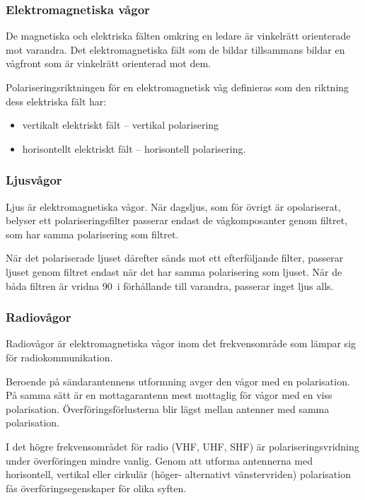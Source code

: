 \subsubsection{Elektromagnetiska vågor}

De magnetiska och elektriska fälten omkring en ledare är vinkelrätt orienterade
mot varandra.
Det elektromagnetiska fält som de bildar tillsammans bildar en vågfront som
är vinkelrätt orienterad mot dem.

Polariseringsriktningen för en elektromagnetisk våg definieras som den riktning
dess elektriska fält har:
\begin{itemize}
  \item vertikalt elektriskt fält -- vertikal polarisering
  \item horisontellt elektriskt fält -- horisontell polarisering.
\end{itemize}

\subsubsection{Ljusvågor}

Ljus är elektromagnetiska vågor.
När dagsljus, som för övrigt är opolariserat, belyser ett polariseringsfilter passerar endast de vågkomposanter genom filtret, som har samma polarisering
som filtret.

När det polariserade ljuset därefter sänds mot ett efterföljande filter, passerar ljuset genom filtret endast när det har samma polarisering som ljuset.
När de båda filtren är vridna 90\degree~i förhållande till varandra, passerar
inget ljus alls.

\subsubsection{Radiovågor}

Radiovågor är elektromagnetiska vågor inom det frekvensområde som lämpar sig
för radiokommunikation.

Beroende på sändarantennens utformning avger den vågor med en polarisation.
På samma sätt är en mottagarantenn mest mottaglig för vågor med en viss
polarisation.
Överföringsförlusterna blir lägst mellan antenner med samma polarisation.

I det högre frekvensområdet för radio (VHF, UHF, SHF) är polariseringsvridning
under överföringen mindre vanlig.
Genom att utforma antennerna med horisontell, vertikal eller cirkulär (höger-
alternativt vänstervriden) polarisation fås överföringsegenskaper för olika
syften.

